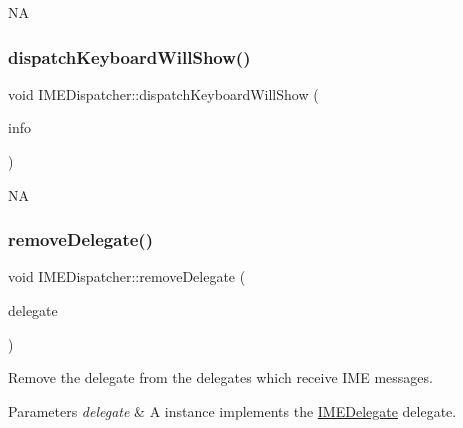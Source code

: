 NA \mbox{\label{classIMEDispatcher_a51d272229b8a061bdf38ee460c2fba03}} 
\subsubsection{\texorpdfstring{dispatch\+Keyboard\+Will\+Show()}{dispatchKeyboardWillShow()}\hspace{0.1cm}{\footnotesize\ttfamily [2/2]}}
{\footnotesize\ttfamily void I\+M\+E\+Dispatcher\+::dispatch\+Keyboard\+Will\+Show (\begin{DoxyParamCaption}\item[{\hyperlink{structIMEKeyboardNotificationInfo}{I\+M\+E\+Keyboard\+Notification\+Info} \&}]{info }\end{DoxyParamCaption})}

NA \mbox{\label{classIMEDispatcher_ac0d379594be4a0e0e7821b60b9ca28a1}} 
\subsubsection{\texorpdfstring{remove\+Delegate()}{removeDelegate()}\hspace{0.1cm}{\footnotesize\ttfamily [1/2]}}
{\footnotesize\ttfamily void I\+M\+E\+Dispatcher\+::remove\+Delegate (\begin{DoxyParamCaption}\item[{\hyperlink{classIMEDelegate}{I\+M\+E\+Delegate} $\ast$}]{delegate }\end{DoxyParamCaption})\hspace{0.3cm}{\ttfamily [protected]}}



Remove the delegate from the delegates which receive I\+ME messages. 


\begin{DoxyParams}{Parameters}
{\em delegate} & A instance implements the \hyperlink{classIMEDelegate}{I\+M\+E\+Delegate} delegate. \\
\hline
\end{DoxyParams}
\mbox{\label{classIMEDispatcher_ac0d379594be4a0e0e7821b60b9ca28a1}} 

